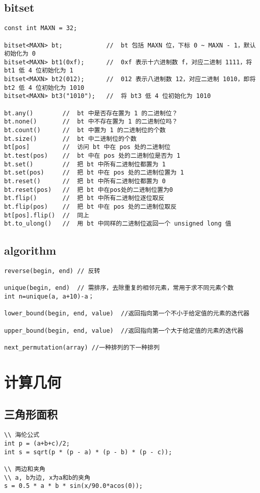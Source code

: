 \subsection{bitset}
\begin{lstlisting}
const int MAXN = 32;

bitset<MAXN> bt;            //  bt 包括 MAXN 位，下标 0 ~ MAXN - 1，默认初始化为 0
bitset<MAXN> bt1(0xf);      //  0xf 表示十六进制数 f，对应二进制 1111，将 bt1 低 4 位初始化为 1
bitset<MAXN> bt2(012);      //  012 表示八进制数 12，对应二进制 1010，即将 bt2 低 4 位初始化为 1010
bitset<MAXN> bt3("1010");   //  将 bt3 低 4 位初始化为 1010

bt.any()        //  bt 中是否存在置为 1 的二进制位？
bt.none()       //  bt 中不存在置为 1 的二进制位吗？
bt.count()      //  bt 中置为 1 的二进制位的个数
bt.size()       //  bt 中二进制位的个数
bt[pos]         //  访问 bt 中在 pos 处的二进制位
bt.test(pos)    //  bt 中在 pos 处的二进制位是否为 1
bt.set()        //  把 bt 中所有二进制位都置为 1
bt.set(pos)     //  把 bt 中在 pos 处的二进制位置为 1
bt.reset()      //  把 bt 中所有二进制位都置为 0
bt.reset(pos)   //  把 bt 中在pos处的二进制位置为0
bt.flip()       //  把 bt 中所有二进制位逐位取反
bt.flip(pos)    //  把 bt 中在 pos 处的二进制位取反
bt[pos].flip()  //  同上
bt.to_ulong()   //  用 bt 中同样的二进制位返回一个 unsigned long 值
\end{lstlisting}


\subsection{algorithm}
\begin{lstlisting}
reverse(begin, end)	// 反转

unique(begin, end)	// 需排序，去除重复的相邻元素，常用于求不同元素个数
int n=unique(a, a+10)-a；

lower_bound(begin, end, value)	//返回指向第一个不小于给定值的元素的迭代器

upper_bound(begin, end, value)	//返回指向第一个大于给定值的元素的迭代器

next_permutation(array)	//一种排列的下一种排列
\end{lstlisting}



\section{计算几何}
\subsection{三角形面积}
\begin{lstlisting}
\\ 海伦公式
int p = (a+b+c)/2;
int s = sqrt(p * (p - a) * (p - b) * (p - c));

\\ 两边和夹角
\\ a, b为边, x为a和b的夹角
s = 0.5 * a * b * sin(x/90.0*acos(0));
\end{lstlisting}

